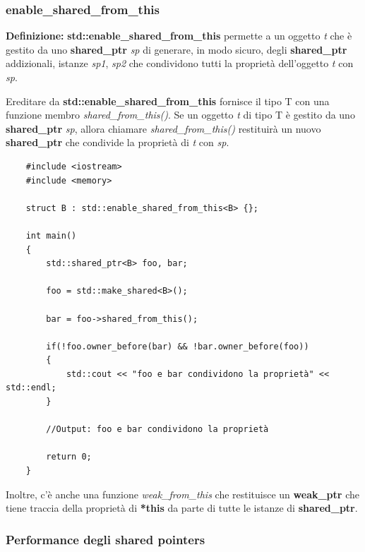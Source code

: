 
\subsubsection{enable\_shared\_from\_this}

\textsf{\small \textbf{Definizione: } \textbf{std::enable\_shared\_from\_this} permette a un oggetto \emph{t} che è gestito da uno \textbf{shared\_ptr} \emph{sp} di generare, in modo sicuro, degli \textbf{shared\_ptr} addizionali, istanze \emph{sp1}, \emph{sp2} che condividono tutti la proprietà dell'oggetto \emph{t} con \emph{sp}.} \break

\textsf{\small Ereditare da \textbf{std::enable\_shared\_from\_this} fornisce il tipo T con una funzione membro \emph{shared\_from\_this()}. Se un oggetto \emph{t} di tipo T è gestito da uno \textbf{shared\_ptr} \emph{sp}, allora chiamare \emph{shared\_from\_this()} restituirà un nuovo \textbf{shared\_ptr} che condivide la proprietà di \emph{t} con \emph{sp}. } \\

\begin{lstlisting}
	#include <iostream>
	#include <memory>
	
	struct B : std::enable_shared_from_this<B> {};
	
	int main()
	{
		std::shared_ptr<B> foo, bar;
		
		foo = std::make_shared<B>();
		
		bar = foo->shared_from_this();
		
		if(!foo.owner_before(bar) && !bar.owner_before(foo))
		{
			std::cout << "foo e bar condividono la proprietà" << std::endl;
		}
	
		//Output: foo e bar condividono la proprietà
	
		return 0;
	}
\end{lstlisting}

\textsf{\small Inoltre, c'è anche una funzione \emph{weak\_from\_this} che restituisce un \textbf{weak\_ptr} che tiene traccia della proprietà di \textbf{*this} da parte di tutte le istanze di \textbf{shared\_ptr}.} \\

\subsubsection{Performance degli shared pointers}

